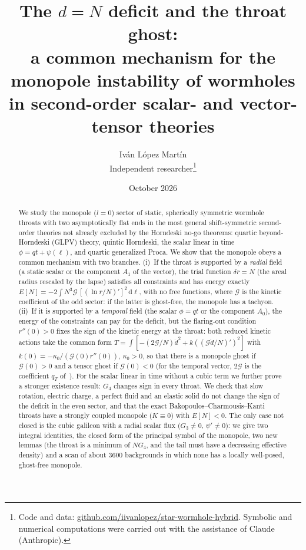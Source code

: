 \documentclass[11pt,a4paper]{article}
\title{The $d=N$ deficit and the throat ghost:\\
a common mechanism for the monopole instability of wormholes\\
in second-order scalar- and vector-tensor theories}
\author{Iván López Martín\\[2pt]
\small Independent researcher\thanks{Code and data: \href{https://github.com/iivanlopez/star-wormhole-hybrid}{github.com/iivanlopez/star-wormhole-hybrid}. Symbolic and numerical computations were carried out with the assistance of Claude (Anthropic).}}
\date{October 2026}
\theoremstyle{remark}
\newcommand{\G}{\mathcal G}
\newcommand{\dd}{\mathrm d}
\begin{document}
\maketitle

\begin{abstract}
We study the monopole ($l=0$) sector of static, spherically symmetric wormhole throats with two asymptotically flat ends in the most general shift-symmetric second-order theories not already excluded by the Horndeski no-go theorems: quartic beyond-Horndeski (GLPV) theory, quintic Horndeski, the scalar linear in time $\phi=qt+\psi(\ell)$, and quartic generalized Proca. We show that the monopole obeys a common mechanism with two branches. (i)~If the throat is supported by a \emph{radial} field (a static scalar or the component $A_1$ of the vector), the trial function $\delta r=N$ (the areal radius rescaled by the lapse) satisfies all constraints and has energy exactly
$E[N]=-2\int N^3\G\,[(\ln r/N)']^2\,\dd\ell$, with no free functions, where $\G$ is the kinetic coefficient of the odd sector: if the latter is ghost-free, the monopole has a tachyon. (ii)~If it is supported by a \emph{temporal} field (the scalar $\phi=qt$ or the component $A_0$), the energy of the constraints can pay for the deficit, but the flaring-out condition $r''(0)>0$ fixes the sign of the kinetic energy at the throat: both reduced kinetic actions take the common form $T=\int[-(2\G/N)\dot d^2+k((\G\dot d/N)')^2]$ with $k(0)=-\kappa_0/(\G(0)r''(0))$, $\kappa_0>0$, so that there is a monopole ghost if $\G(0)>0$ and a tensor ghost if $\G(0)<0$ (for the temporal vector, $2\G$ is the coefficient $q_T$ of~\cite{DeFeliceProca}). For the scalar linear in time without a cubic term we further prove a stronger existence result: $G_4$ changes sign in every throat. We check that slow rotation, electric charge, a perfect fluid and an elastic solid do not change the sign of the deficit in the even sector, and that the exact Bakopoulos--Charmousis--Kanti throats have a strongly coupled monopole ($K\equiv0$) with $E[N]<0$. The only case not closed is the cubic galileon with a radial scalar flux ($G_3\neq0$, $\psi'\neq0$): we give two integral identities, the closed form of the principal symbol of the monopole, two new lemmas (the throat is a minimum of $NG_4$, and the tail must have a decreasing effective density) and a scan of about 3600 backgrounds in which none has a locally well-posed, ghost-free monopole.
\end{abstract}

\tableofcontents
\end{document}
